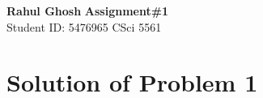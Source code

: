 \documentclass[letter, 11pt]{article}
\begin{document}
\noindent
\large \textbf{Rahul Ghosh} \hfill \textbf{Assignment\#1}\\
\normalsize Student ID: 5476965 \hfill CSci 5561\\

\section*{Solution of Problem 1}
\end{document}
